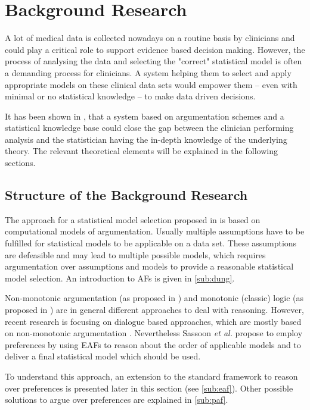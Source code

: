 \section{Background Research}
\label{sec:background}

A lot of medical data is collected nowadays on a routine basis by clinicians and could play a critical role to support evidence based decision making. However, the process of analysing the data and selecting the "correct" statistical model is often a demanding process for clinicians. A system helping them to select and apply appropriate models on these clinical data sets would empower them -- even with minimal or no statistical knowledge -- to make data driven decisions. 

It has been shown in \cite{sassoon2014}, that a system based on argumentation schemes and a statistical knowledge base could close the gap between the clinician performing analysis and the statistician having the in-depth knowledge of the underlying theory. The relevant theoretical elements will be explained in the following sections.


\subsection{Structure of the Background Research}

The approach for a statistical model selection proposed in \cite{sassoon2014} is based on computational models of argumentation. Usually multiple assumptions have to be fulfilled for statistical models to be applicable on a data set. These assumptions are defeasible and may lead to multiple possible models, which requires argumentation over assumptions and models to provide a reasonable statistical model selection. An introduction to \glspl{AF} is given in \autoref{sub:dung}. 

Non-monotonic argumentation (as proposed in \cite{dung1995,liao}) and monotonic (classic) logic (as proposed in \cite{Reiter1980}) are in general different approaches to deal with reasoning. However, recent research is focusing on dialogue based approaches, which are mostly based on non-monotonic argumentation \cite{parsons2000,Walton1995}. 
Nevertheless Sassoon \textit{et al.} propose to employ preferences by using \glspl{EAF} to reason about the order of applicable models and to deliver a final statistical model which should be used. 

To understand this approach, an extension to the standard framework to reason over preferences is presented later in this section (see \autoref{sub:eaf}). Other possible solutions to argue over preferences are explained in \autoref{sub:paf}.

